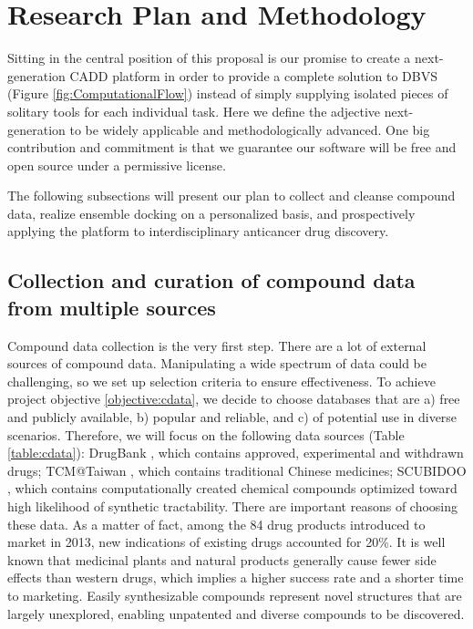 \documentclass[a4paper,12pt]{article}
\begin{document}
\section*{Research Plan and Methodology}

Sitting in the central position of this proposal is our promise to create a next-generation CADD platform in order to provide a complete solution to DBVS (Figure \ref{fig:ComputationalFlow}) instead of simply supplying isolated pieces of solitary tools for each individual task. Here we define the adjective next-generation to be widely applicable and methodologically advanced. One big contribution and commitment is that we guarantee our software will be free and open source under a permissive license.

The following subsections will present our plan to collect and cleanse compound data, realize ensemble docking on a personalized basis, and prospectively applying the platform to interdisciplinary anticancer drug discovery.

\subsection*{Collection and curation of compound data from multiple sources}

Compound data collection is the very first step. There are a lot of external sources of compound data. Manipulating a wide spectrum of data could be challenging, so we set up selection criteria to ensure effectiveness. To achieve project objective \ref{objective:cdata}, we decide to choose databases that are a) free and publicly available, b) popular and reliable, and c) of potential use in diverse scenarios. Therefore, we will focus on the following data sources (Table \ref{table:cdata}): DrugBank \citep{1594}, which contains approved, experimental and withdrawn drugs; TCM@Taiwan \citep{528}, which contains traditional Chinese medicines; SCUBIDOO \citep{1682}, which contains computationally created chemical compounds optimized toward high likelihood of synthetic tractability. There are important reasons of choosing these data. As a matter of fact, among the 84 drug products introduced to market in 2013, new indications of existing drugs accounted for 20\%. It is well known that medicinal plants and natural products generally cause fewer side effects than western drugs, which implies a higher success rate and a shorter time to marketing. Easily synthesizable compounds represent novel structures that are largely unexplored, enabling unpatented and diverse compounds to be discovered.
\end{document}
